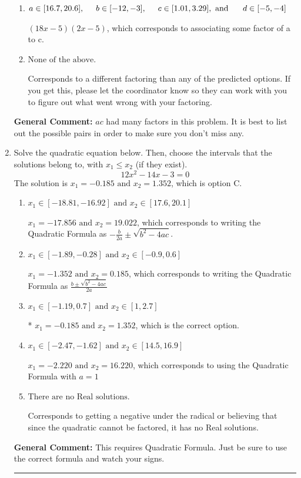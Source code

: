 \documentclass{extbook}[14pt]
\newcommand{\litem}[1]{\item #1

\rule{\textwidth}{0.4pt}}
\begin{document}
\begin{enumerate}
{\begin{enumerate}[label=\Alph*.]
* $(6x -5)(6x -5)$, which is the correct option.
\item \( a \in [16.7, 20.6], \hspace*{5mm} b \in [-12, -3], \hspace*{5mm} c \in [1.01, 3.29], \text{ and } \hspace*{5mm} d \in [-5, -4] \)

 $(18x -5)(2x -5)$, which corresponds to associating some factor of a to c.
\item \( \text{None of the above.} \)

 Corresponds to a different factoring than any of the predicted options. If you get this, please let the coordinator know so they can work with you to figure out what went wrong with your factoring.
\end{enumerate}

\textbf{General Comment:} $ac$ had many factors in this problem. It is best to list out the possible pairs in order to make sure you don't miss any.
}
\litem{
Solve the quadratic equation below. Then, choose the intervals that the solutions belong to, with $x_1 \leq x_2$ (if they exist).
\[ 12x^{2} -14 x -3 = 0 \]The solution is \( x_1 = -0.185 \text{ and } x_2 = 1.352 \), which is option C.\begin{enumerate}[label=\Alph*.]
\item \( x_1 \in [-18.81, -16.92] \text{ and } x_2 \in [17.6, 20.1] \)

 $x_1 = -17.856 \text{ and } x_2 = 19.022$, which corresponds to writing the Quadratic Formula as $-\frac{b}{2a} \pm \sqrt{b^2 - 4ac}$.
\item \( x_1 \in [-1.89, -0.28] \text{ and } x_2 \in [-0.9, 0.6] \)

 $x_1 = -1.352 \text{ and } x_2 = 0.185$, which corresponds to writing the Quadratic Formula as $\frac{b \pm \sqrt{b^2 - 4ac}}{2a}$
\item \( x_1 \in [-1.19, 0.7] \text{ and } x_2 \in [1, 2.7] \)

* $x_1 = -0.185 \text{ and } x_2 = 1.352$, which is the correct option.
\item \( x_1 \in [-2.47, -1.62] \text{ and } x_2 \in [14.5, 16.9] \)

 $x_1 = -2.220 \text{ and } x_2 = 16.220$, which corresponds to using the Quadratic Formula with $a=1$
\item \( \text{There are no Real solutions.} \)

Corresponds to getting a negative under the radical or believing that since the quadratic cannot be factored, it has no Real solutions.
\end{enumerate}

\textbf{General Comment:} This requires Quadratic Formula. Just be sure to use the correct formula and watch your signs.
}
\end{enumerate}
\end{document}
